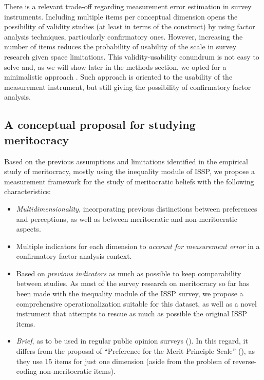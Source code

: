 \documentclass[
  10pt,
  a4paper,
]{article}
\begin{document}
There is a relevant trade-off regarding measurement error estimation in survey instruments. Including multiple items per conceptual dimension opens the possibility of validity studies (at least in terms of the construct) by using factor analysis techniques, particularly confirmatory ones. However, increasing the number of items reduces the probability of usability of the scale in survey research given space limitations. This validity-usability conundrum is not easy to solve and, as we will show later in the methods section, we opted for a minimalistic approach . Such approach is oriented to the usability of the measurement instrument, but still giving the possibility of confirmatory factor analysis.

\subsection*{A conceptual proposal for studying meritocracy}\label{instrumentprop}

Based on the previous assumptions and limitations identified in the empirical study of meritocracy, mostly using the inequality module of ISSP, we propose a measurement framework for the study of meritocratic beliefs with the following characteristics:

\begin{itemize}
\item
  \emph{Multidimensionality}, incorporating previous distinctions between preferences and perceptions, as well as between meritocratic and non-meritocratic aspects.
\item
  Multiple indicators for each dimension to \emph{account for measurement error} in a confirmatory factor analysis context.
\item
  Based on \emph{previous indicators} as much as possible to keep comparability between studies. As most of the survey research on meritocracy so far has been made with the inequality module of the ISSP survey, we propose a comprehensive operationalization suitable for this dataset, as well as a novel instrument that attempts to rescue as much as possible the original ISSP items.
\item
  \emph{Brief}, as to be used in regular public opinion surveys (). In this regard, it differs from the proposal of ``Preference for the Merit Principle Scale'' (), as they use 15 items for just one dimension (aside from the problem of reverse-coding non-meritocratic items).
\end{itemize}
\end{document}
